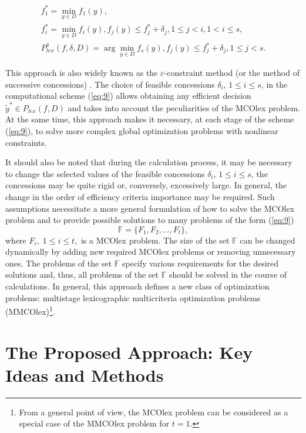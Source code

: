 \documentclass[smallextended]{svjour3}       %
\begin{document}
\begin{equation}\label{eq:9}
\begin{matrix}
f^*_1 =\min_{y \in D}{f_1(y)},  \\
f^*_i =\min_{y \in D}{f_i(y)},  f_j(y) \leq f^*_j + \delta_j, 1 \leq j < i, 1 < i \leq s, \\
P_{lex}^\delta(f,\delta,D) = \arg \min_{y \in D}{f_s(y)},f_j(y) \leq f^*_j + \delta_j, 1 \leq j < s.
\end{matrix}
\end{equation}

This approach is also widely known as the $\varepsilon$-constraint method (or the method of successive concessions) \cite{c39,c40,c41,c42}. The choice of feasible concessions $\delta_i$, $1 \leq i \leq s$, in the computational scheme (\ref{eq:9}) allows obtaining any efficient decision $\widetilde{y}^* \in P_{lex}(f,D)$ and takes into account the peculiarities of the MCOlex problem. At the same time, this approach makes it necessary, at each stage of the scheme (\ref{eq:9}), to solve more complex global optimization problems with nonlinear constraints.

It should also be noted that during the calculation process, it may be necessary to change the selected values of the feasible concessions $\delta_i$, $1 \leq i \leq s$, the concessions may be quite rigid or, conversely, excessively large. In general, the change in the order of efficiency criteria importance may be required. Such assumptions necessitate a more general formulation of how to solve the MCOlex problem and to provide possible solutions to many problems of the form (\ref{eq:9})
\begin{equation}\label{eq:10}
\mathbb{F}=\{ F_1,F_2,\dots,F_t\},
\end{equation}
where $F_i, \; 1\leq i \leq t,$ is a MCOlex problem. The size of the set $\mathbb{F}$ can be changed 
dynamically by adding new required MCOlex problems or removing unnecessary ones. 
The problems of the set $\mathbb{F}$ specify various requirements for the desired solutions and, thus, all problems of the set $\mathbb{F}$ should be solved in the course of calculations.
In general, this approach defines a new class of optimization problems: multistage lexicographic multicriteria optimization problems (MMCOlex)\footnote{From a general point of view, the MCOlex problem can be considered as a special case of the MMCOlex problem for $t=1$.}.

\section{The Proposed Approach: Key Ideas and Methods}
\label{sec:3}
\end{document}
